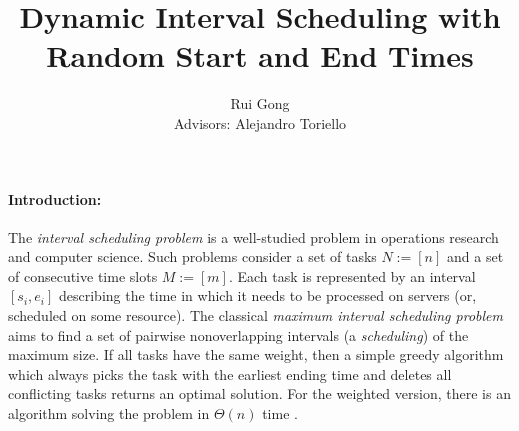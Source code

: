 \documentclass{article}
\begin{document}
\title{Dynamic Interval Scheduling with\\Random Start and End Times}
\author{Rui Gong\\
Advisors: Alejandro Toriello}
\maketitle
\vspace{-20pt}
\paragraph{\textbf{Introduction:}}
The \emph{interval scheduling problem} is a well-studied problem in operations research and computer science.
Such problems consider a set of tasks $N:=[n]$ and a set of consecutive time slots $M:=[m]$.
Each task is represented by an interval $[s_i,e_i]$ describing the time in which it needs to be processed on servers (or, scheduled on some resource).
The classical \emph{maximum interval scheduling problem} aims to find a set of pairwise nonoverlapping intervals (a \emph{scheduling}) of the maximum size.
If all tasks have the same weight, then a simple greedy algorithm which always picks the task with the earliest ending time and deletes all conflicting tasks returns an optimal solution.
For the weighted version, there is an algorithm solving the problem in $\Theta(n)$ time \cite{Kleinberg+Tardos:06a}.
\end{document}
